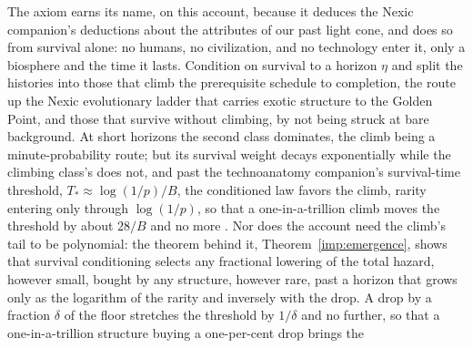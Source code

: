 \begin{remark}\label{gc:rem:axiomgolden}
The axiom earns its name, on this account, because it deduces
the Nexic companion's deductions about the attributes of our past light
cone, and does so from survival alone: no humans, no civilization, and
no technology enter it, only a biosphere and the time it lasts. Condition
on survival to a horizon $\eta$ and split the histories into those that
climb the prerequisite schedule to completion, the route up the Nexic
evolutionary ladder that carries exotic structure to the Golden Point,
and those that survive without climbing, by not being struck at bare
background. At short horizons the second class dominates, the climb
being a minute-probability route; but its survival weight decays
exponentially while the climbing class's does not, and past the
technoanatomy companion's survival-time threshold,
$T_\ast\approx\log(1/p)/B$, the conditioned law favors the
climb, rarity entering only through $\log(1/p)$, so that a
one-in-a-trillion climb moves the threshold by about $28/B$ and
no more \cite{GoldenTechnoanatomy}. Nor does the account need the
climb's tail to be polynomial: the theorem behind it,
Theorem~\ref{imp:emergence}, shows that survival conditioning selects any
fractional lowering of the total hazard, however small, bought by any
structure, however rare, past a horizon that grows only as the logarithm
of the rarity and inversely with the drop. A drop by a fraction $\delta$
of the floor stretches the threshold by $1/\delta$ and no further, so
that a one-in-a-trillion structure buying a one-per-cent drop brings the

\end{remark}
